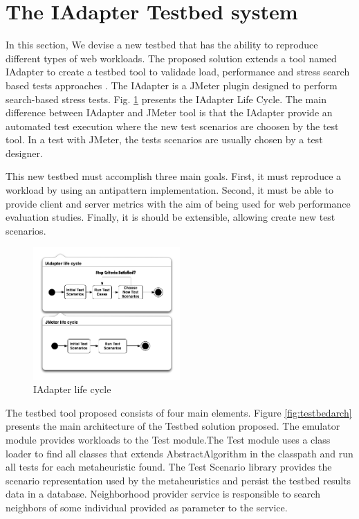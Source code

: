 
\vspace*{-.075in}
\section{The IAdapter Testbed system}\label{sec:technique}
\vspace*{-.075in}


In this section, We devise a new testbed that has the ability to reproduce different types of web workloads.  The proposed solution extends a tool named IAdapter to create a testbed tool to validade load, performance and stress search based tests approaches \cite{Gois2016}. The IAdapter is a JMeter plugin designed to perform search-based stress tests. Fig. \ref{fig:iadapterlifecycle} presents the IAdapter Life Cycle. The main difference between IAdapter and JMeter tool is that the IAdapter provide an automated test execution where the new test scenarios are choosen by the test tool.  In a test with JMeter, the tests scenarios are usually chosen by a test designer.

This new testbed must accomplish three main goals. First, it must reproduce a workload by using an antipattern implementation. Second, it must be able to provide client and server metrics with the aim of being used for web performance evaluation studies. Finally, it is should be extensible, allowing create new test scenarios.


\begin{figure}[h]
\centering
\includegraphics[width=0.5\textwidth]{./images/lifecycle2.png}
\caption{IAdapter life cycle}
\label{fig:iadapterlifecycle}
\end{figure}


The testbed tool proposed consists of four main elements.  Figure \ref{fig:testbedarch} presents the main architecture of the Testbed solution proposed. The emulator module provides workloads to the Test module.The Test module uses a class loader to find all classes that extends AbstractAlgorithm in the classpath and run all tests for each metaheuristic found. The Test Scenario library provides the scenario representation used by the metaheuristics and persist the testbed results data in a database. Neighborhood provider service is responsible to search neighbors of some individual provided as parameter to the service.

